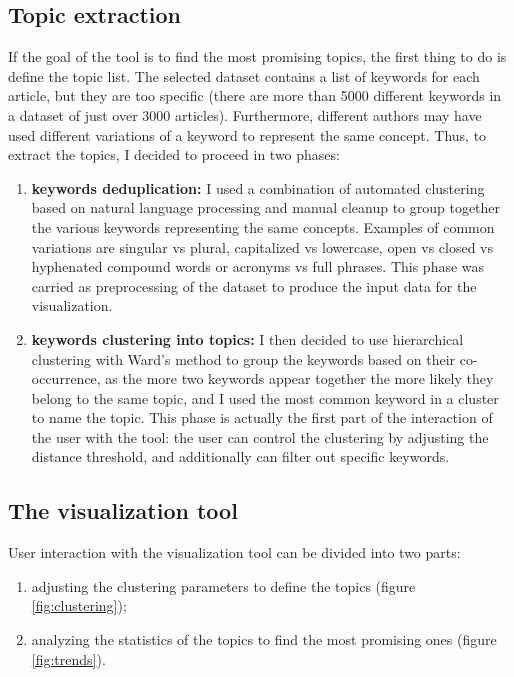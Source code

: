 \documentclass[11pt]{article}
\begin{document}
\subsection{Topic extraction}
If the goal of the tool is to find the most promising topics, the first thing to do is define the topic list. The selected dataset contains a list of keywords for each article, but they are too specific (there are more than 5000 different keywords in a dataset of just over 3000 articles). Furthermore, different authors may have used different variations of a keyword to represent the same concept. Thus, to extract the topics, I decided to proceed in two phases:
\begin{enumerate}
\item \textbf{keywords deduplication: }I used a combination of automated clustering based on natural language processing and manual cleanup to group together the various keywords representing the same concepts. Examples of common variations are singular vs plural, capitalized vs lowercase, open vs closed vs hyphenated compound words or acronyms vs full phrases. This phase was carried as preprocessing of the dataset to produce the input data for the visualization.
 \item \textbf{keywords clustering into topics: }I then decided to use hierarchical clustering with Ward’s method to group the keywords based on their co-occurrence, as the more two keywords appear together the more likely they belong to the same topic, and I used the most common keyword in a cluster to name the topic. This phase is actually the first part of the interaction of the user with the tool: the user can control the clustering by adjusting the distance threshold, and additionally can filter out specific keywords. 
\end{enumerate}

 
 \subsection{The visualization tool}
User interaction with the visualization tool can be divided into two parts:
\begin{enumerate}
\item adjusting the clustering parameters to define the topics (figure \ref{fig:clustering});
\item analyzing the statistics of the topics to find the most promising ones (figure \ref{fig:trends}).
\end{enumerate}

 ~
 
\end{document}
